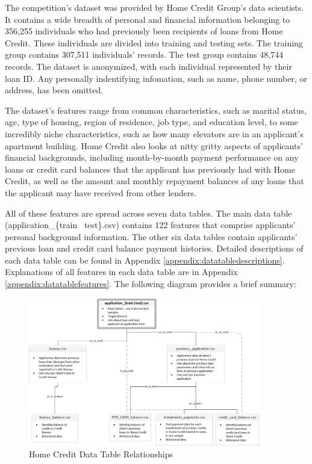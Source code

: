 \documentclass[12pt, letterpaper]{article}
\begin{document}
The competition's dataset was provided by Home Credit Group's data scientists. It contains a wide breadth of personal and financial information belonging to 356,255 individuals who had previously been recipients of loans from Home Credit. These individuals are divided into training and testing sets. The training group contains 307,511 individuals' records. The test group contains 48,744 records. The dataset is anonymized, with each individual represented by their loan ID. Any personally indentifying infomation, such as name, phone number, or address, has been omitted.

The dataset's features range from common characteristics, such as marital status, age, type of housing, region of residence, job type, and education level, to some incredibly niche characteristics, such as how many elevators are in an applicant's apartment building. Home Credit also looks at nitty gritty aspects of applicants' financial backgrounds, including month-by-month payment performance on any loans or credit card balances that the applicant has previously had with Home Credit, as well as the amount and monthly repayment balances of any loans that the applicant may have received from other lenders.

All of these features are spread across seven data tables. The main data table (application_\{train \textbar~test\}.csv) contains 122 features that comprise applicants' personal background information. The other six data tables contain applicants' previous loan and credit card balance payment histories. Detailed descriptions of each data table can be found in Appendix \ref{appendix:datatabledescriptions}. Explanations of all features in each data table are in Appendix \ref{appendix:datatablefeatures}. The following diagram provides a brief summary:

\begin{figure}[ht]
\includegraphics[width=0.9\textwidth]{homecredit}
\centering
\caption{Home Credit Data Table Relationships\cite{kagglehomecreditcompetitiondata}}
\end{figure}
\end{document}
